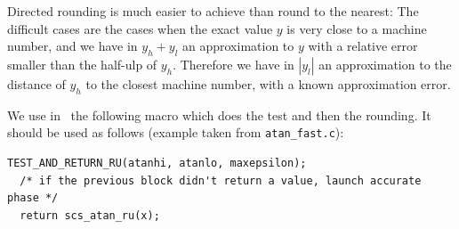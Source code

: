 Directed rounding is much easier to achieve than round to the nearest:
The difficult cases are the cases when the exact value $y$ is very
close to a machine number, and we have in $y_h+y_l$ an approximation to
$y$ with a relative error smaller than the half-ulp of $y_h$.
Therefore we have in $|y_l|$ an approximation to the distance of
$y_h$ to the closest machine number, with a known approximation error.



We use in \crlibm\ the following macro which does the test and then the rounding. 
It should be used as follows (example taken from \texttt{atan\_fast.c}):

\begin{lstlisting}[caption={An occurence of the test for rounding up},
  firstnumber=1]
  TEST_AND_RETURN_RU(atanhi, atanlo, maxepsilon);
  /* if the previous block didn't return a value, launch accurate phase */
  return scs_atan_ru(x);
\end{lstlisting}



